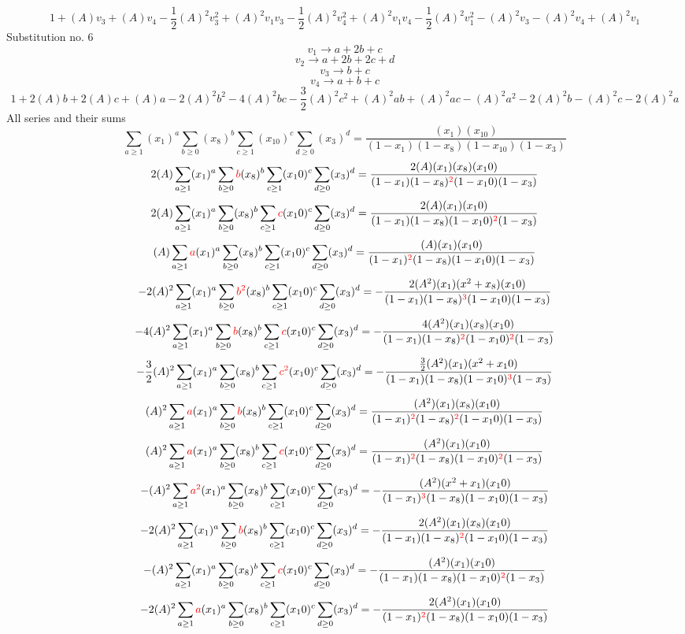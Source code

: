 \documentclass{article}
\begin{document}
\[1+(A)v_3+(A)v_4-\frac{1}{2}(A)^2v_3^{2}+(A)^2v_1v_3-\frac{1}{2}(A)^2v_4^{2}+(A)^2v_1v_4-\frac{1}{2}(A)^2v_1^{2}-(A)^2v_3-(A)^2v_4+(A)^2v_1\]Substitution no. 6\[v_1\rightarrow{a+2b+c}\]\[v_2\rightarrow{a+2b+2c+d}\]\[v_3\rightarrow{b+c}\]\[v_4\rightarrow{a+b+c}\]\[1+2(A)b+2(A)c+(A)a-2(A)^2b^{2}-4(A)^2bc-\frac{3}{2}(A)^2c^{2}+(A)^2ab+(A)^2ac-(A)^2a^{2}-2(A)^2b-(A)^2c-2(A)^2a\]All series and their sums\[\sum_{a\geq{1}}(x_1)^{a}\sum_{b\geq{0}}(x_8)^{b}\sum_{c\geq{1}}(x_10)^{c}\sum_{d\geq{0}}(x_3)^{d}=\frac{(x_1)(x_10)}{(1-x_1)(1-x_8)(1-x_10)(1-x_3)}\]\[2(A)\sum_{a\geq{1}}(x_1)^{a}\sum_{b\geq{0}}\textcolor{red}{b}(x_8)^{b}\sum_{c\geq{1}}(x_10)^{c}\sum_{d\geq{0}}(x_3)^{d}=\frac{2(A)(x_1)(x_8)(x_10)}{(1-x_1)(1-x_8)^{\textcolor{red}{2}}(1-x_10)(1-x_3)}\]\[2(A)\sum_{a\geq{1}}(x_1)^{a}\sum_{b\geq{0}}(x_8)^{b}\sum_{c\geq{1}}\textcolor{red}{c}(x_10)^{c}\sum_{d\geq{0}}(x_3)^{d}=\frac{2(A)(x_1)(x_10)}{(1-x_1)(1-x_8)(1-x_10)^{\textcolor{red}{2}}(1-x_3)}\]\[(A)\sum_{a\geq{1}}\textcolor{red}{a}(x_1)^{a}\sum_{b\geq{0}}(x_8)^{b}\sum_{c\geq{1}}(x_10)^{c}\sum_{d\geq{0}}(x_3)^{d}=\frac{(A)(x_1)(x_10)}{(1-x_1)^{\textcolor{red}{2}}(1-x_8)(1-x_10)(1-x_3)}\]\[-2(A)^{2}\sum_{a\geq{1}}(x_1)^{a}\sum_{b\geq{0}}\textcolor{red}{b^{2}}(x_8)^{b}\sum_{c\geq{1}}(x_10)^{c}\sum_{d\geq{0}}(x_3)^{d}=-\frac{2(A^{2})(x_1)(x^{2}+x_8)(x_10)}{(1-x_1)(1-x_8)^{\textcolor{red}{3}}(1-x_10)(1-x_3)}\]\[-4(A)^{2}\sum_{a\geq{1}}(x_1)^{a}\sum_{b\geq{0}}\textcolor{red}{b}(x_8)^{b}\sum_{c\geq{1}}\textcolor{red}{c}(x_10)^{c}\sum_{d\geq{0}}(x_3)^{d}=-\frac{4(A^{2})(x_1)(x_8)(x_10)}{(1-x_1)(1-x_8)^{\textcolor{red}{2}}(1-x_10)^{\textcolor{red}{2}}(1-x_3)}\]\[-\frac{3}{2}(A)^{2}\sum_{a\geq{1}}(x_1)^{a}\sum_{b\geq{0}}(x_8)^{b}\sum_{c\geq{1}}\textcolor{red}{c^{2}}(x_10)^{c}\sum_{d\geq{0}}(x_3)^{d}=-\frac{\frac{3}{2}(A^{2})(x_1)(x^{2}+x_10)}{(1-x_1)(1-x_8)(1-x_10)^{\textcolor{red}{3}}(1-x_3)}\]\[(A)^{2}\sum_{a\geq{1}}\textcolor{red}{a}(x_1)^{a}\sum_{b\geq{0}}\textcolor{red}{b}(x_8)^{b}\sum_{c\geq{1}}(x_10)^{c}\sum_{d\geq{0}}(x_3)^{d}=\frac{(A^{2})(x_1)(x_8)(x_10)}{(1-x_1)^{\textcolor{red}{2}}(1-x_8)^{\textcolor{red}{2}}(1-x_10)(1-x_3)}\]\[(A)^{2}\sum_{a\geq{1}}\textcolor{red}{a}(x_1)^{a}\sum_{b\geq{0}}(x_8)^{b}\sum_{c\geq{1}}\textcolor{red}{c}(x_10)^{c}\sum_{d\geq{0}}(x_3)^{d}=\frac{(A^{2})(x_1)(x_10)}{(1-x_1)^{\textcolor{red}{2}}(1-x_8)(1-x_10)^{\textcolor{red}{2}}(1-x_3)}\]\[-(A)^{2}\sum_{a\geq{1}}\textcolor{red}{a^{2}}(x_1)^{a}\sum_{b\geq{0}}(x_8)^{b}\sum_{c\geq{1}}(x_10)^{c}\sum_{d\geq{0}}(x_3)^{d}=-\frac{(A^{2})(x^{2}+x_1)(x_10)}{(1-x_1)^{\textcolor{red}{3}}(1-x_8)(1-x_10)(1-x_3)}\]\[-2(A)^{2}\sum_{a\geq{1}}(x_1)^{a}\sum_{b\geq{0}}\textcolor{red}{b}(x_8)^{b}\sum_{c\geq{1}}(x_10)^{c}\sum_{d\geq{0}}(x_3)^{d}=-\frac{2(A^{2})(x_1)(x_8)(x_10)}{(1-x_1)(1-x_8)^{\textcolor{red}{2}}(1-x_10)(1-x_3)}\]\[-(A)^{2}\sum_{a\geq{1}}(x_1)^{a}\sum_{b\geq{0}}(x_8)^{b}\sum_{c\geq{1}}\textcolor{red}{c}(x_10)^{c}\sum_{d\geq{0}}(x_3)^{d}=-\frac{(A^{2})(x_1)(x_10)}{(1-x_1)(1-x_8)(1-x_10)^{\textcolor{red}{2}}(1-x_3)}\]\[-2(A)^{2}\sum_{a\geq{1}}\textcolor{red}{a}(x_1)^{a}\sum_{b\geq{0}}(x_8)^{b}\sum_{c\geq{1}}(x_10)^{c}\sum_{d\geq{0}}(x_3)^{d}=-\frac{2(A^{2})(x_1)(x_10)}{(1-x_1)^{\textcolor{red}{2}}(1-x_8)(1-x_10)(1-x_3)}\]
\end{document}
